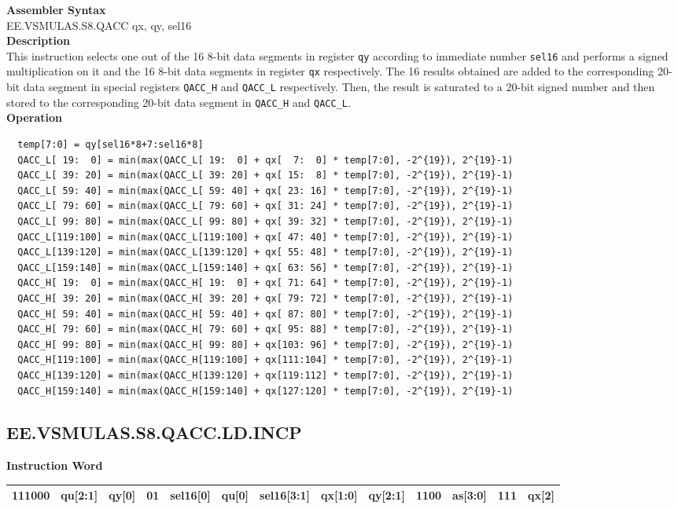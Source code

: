 \textbf{Assembler Syntax} \\
EE.VSMULAS.S8.QACC qx, qy, sel16 \\
\textbf{Description} \\
This instruction selects one out of the 16 8-bit data segments in register \lstinline{qy} according to immediate number \lstinline{sel16} and performs a signed multiplication on it and the 16 8-bit data segments in register \lstinline{qx} respectively. The 16 results obtained are added to the corresponding 20-bit data segment in special registers \lstinline{QACC_H} and \lstinline{QACC_L} respectively. Then, the result is saturated to a 20-bit signed number and then stored to the corresponding 20-bit data segment in \lstinline{QACC_H} and \lstinline{QACC_L}.\\
\textbf{Operation}
\begin{lstlisting}
  temp[7:0] = qy[sel16*8+7:sel16*8]
  QACC_L[ 19:  0] = min(max(QACC_L[ 19:  0] + qx[  7:  0] * temp[7:0], -2^{19}), 2^{19}-1)
  QACC_L[ 39: 20] = min(max(QACC_L[ 39: 20] + qx[ 15:  8] * temp[7:0], -2^{19}), 2^{19}-1)
  QACC_L[ 59: 40] = min(max(QACC_L[ 59: 40] + qx[ 23: 16] * temp[7:0], -2^{19}), 2^{19}-1)
  QACC_L[ 79: 60] = min(max(QACC_L[ 79: 60] + qx[ 31: 24] * temp[7:0], -2^{19}), 2^{19}-1)
  QACC_L[ 99: 80] = min(max(QACC_L[ 99: 80] + qx[ 39: 32] * temp[7:0], -2^{19}), 2^{19}-1)
  QACC_L[119:100] = min(max(QACC_L[119:100] + qx[ 47: 40] * temp[7:0], -2^{19}), 2^{19}-1)
  QACC_L[139:120] = min(max(QACC_L[139:120] + qx[ 55: 48] * temp[7:0], -2^{19}), 2^{19}-1)
  QACC_L[159:140] = min(max(QACC_L[159:140] + qx[ 63: 56] * temp[7:0], -2^{19}), 2^{19}-1)
  QACC_H[ 19:  0] = min(max(QACC_H[ 19:  0] + qx[ 71: 64] * temp[7:0], -2^{19}), 2^{19}-1)
  QACC_H[ 39: 20] = min(max(QACC_H[ 39: 20] + qx[ 79: 72] * temp[7:0], -2^{19}), 2^{19}-1)
  QACC_H[ 59: 40] = min(max(QACC_H[ 59: 40] + qx[ 87: 80] * temp[7:0], -2^{19}), 2^{19}-1)
  QACC_H[ 79: 60] = min(max(QACC_H[ 79: 60] + qx[ 95: 88] * temp[7:0], -2^{19}), 2^{19}-1)
  QACC_H[ 99: 80] = min(max(QACC_H[ 99: 80] + qx[103: 96] * temp[7:0], -2^{19}), 2^{19}-1)
  QACC_H[119:100] = min(max(QACC_H[119:100] + qx[111:104] * temp[7:0], -2^{19}), 2^{19}-1)
  QACC_H[139:120] = min(max(QACC_H[139:120] + qx[119:112] * temp[7:0], -2^{19}), 2^{19}-1)
  QACC_H[159:140] = min(max(QACC_H[159:140] + qx[127:120] * temp[7:0], -2^{19}), 2^{19}-1)
\end{lstlisting}

\clearpage
\subsection{EE.VSMULAS.S8.QACC.LD.INCP}\label{instruction:EEVSMULASS8QACCLDINCP}
\setlength\tabcolsep{6pt}
\textbf{Instruction Word} \\
\begin{tabular}{|c|c|c|c|c|c|c|c|c|c|c|c|c|}
	\hline
	111000 & qu[2:1] & qy[0] & 01 & sel16[0] & qu[0] & sel16[3:1] & qx[1:0] & qy[2:1] & 1100 & as[3:0] & 111 & qx[2] \\
	\hline
\end{tabular}

